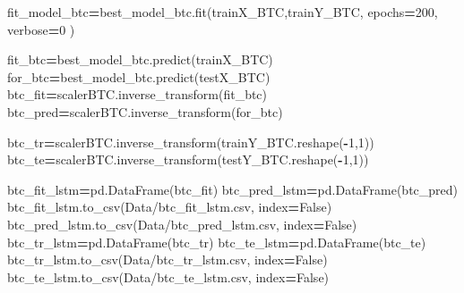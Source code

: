 \documentclass[
]{article}
\newenvironment{Shaded}{\begin{snugshade}}{\end{snugshade}}
\newcommand{\DecValTok}[1]{\textcolor[rgb]{0.00,0.00,0.81}{#1}}
\newcommand{\NormalTok}[1]{#1}
\newcommand{\OperatorTok}[1]{\textcolor[rgb]{0.81,0.36,0.00}{\textbf{#1}}}
\newcommand{\StringTok}[1]{\textcolor[rgb]{0.31,0.60,0.02}{#1}}
\newcommand{\VariableTok}[1]{\textcolor[rgb]{0.00,0.00,0.00}{#1}}
\begin{document}
\begin{Shaded}
\begin{Highlighting}[]
\NormalTok{fit\_model\_btc}\OperatorTok{=}\NormalTok{best\_model\_btc.fit(trainX\_BTC,trainY\_BTC,}
\NormalTok{                            epochs}\OperatorTok{=}\DecValTok{200}\NormalTok{, verbose}\OperatorTok{=}\DecValTok{0}\NormalTok{ )}
\end{Highlighting}
\end{Shaded}

\begin{Shaded}
\begin{Highlighting}[]
\NormalTok{fit\_btc}\OperatorTok{=}\NormalTok{best\_model\_btc.predict(trainX\_BTC)}
\NormalTok{for\_btc}\OperatorTok{=}\NormalTok{best\_model\_btc.predict(testX\_BTC)}
\NormalTok{btc\_fit}\OperatorTok{=}\NormalTok{scalerBTC.inverse\_transform(fit\_btc)}
\NormalTok{btc\_pred}\OperatorTok{=}\NormalTok{scalerBTC.inverse\_transform(for\_btc)}

\NormalTok{btc\_tr}\OperatorTok{=}\NormalTok{scalerBTC.inverse\_transform(trainY\_BTC.reshape(}\OperatorTok{{-}}\DecValTok{1}\NormalTok{,}\DecValTok{1}\NormalTok{))}
\NormalTok{btc\_te}\OperatorTok{=}\NormalTok{scalerBTC.inverse\_transform(testY\_BTC.reshape(}\OperatorTok{{-}}\DecValTok{1}\NormalTok{,}\DecValTok{1}\NormalTok{))}
\end{Highlighting}
\end{Shaded}

\begin{Shaded}
\begin{Highlighting}[]
\NormalTok{btc\_fit\_lstm}\OperatorTok{=}\NormalTok{pd.DataFrame(btc\_fit)}
\NormalTok{btc\_pred\_lstm}\OperatorTok{=}\NormalTok{pd.DataFrame(btc\_pred)}
\NormalTok{btc\_fit\_lstm.to\_csv(}\StringTok{\textquotesingle{}Data/btc\_fit\_lstm.csv\textquotesingle{}}\NormalTok{, index}\OperatorTok{=}\VariableTok{False}\NormalTok{)}
\NormalTok{btc\_pred\_lstm.to\_csv(}\StringTok{\textquotesingle{}Data/btc\_pred\_lstm.csv\textquotesingle{}}\NormalTok{, index}\OperatorTok{=}\VariableTok{False}\NormalTok{)}
\NormalTok{btc\_tr\_lstm}\OperatorTok{=}\NormalTok{pd.DataFrame(btc\_tr)}
\NormalTok{btc\_te\_lstm}\OperatorTok{=}\NormalTok{pd.DataFrame(btc\_te)}
\NormalTok{btc\_tr\_lstm.to\_csv(}\StringTok{\textquotesingle{}Data/btc\_tr\_lstm.csv\textquotesingle{}}\NormalTok{, index}\OperatorTok{=}\VariableTok{False}\NormalTok{)}
\NormalTok{btc\_te\_lstm.to\_csv(}\StringTok{\textquotesingle{}Data/btc\_te\_lstm.csv\textquotesingle{}}\NormalTok{, index}\OperatorTok{=}\VariableTok{False}\NormalTok{)}
\end{Highlighting}
\end{Shaded}
\end{document}
